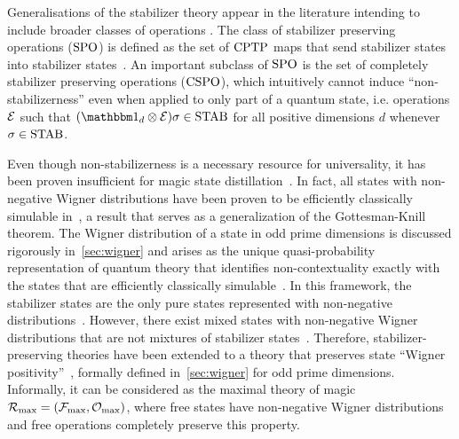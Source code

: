 \documentclass[pra,
aps,
twocolumn,
superscriptaddress,
groupedaddress,
nofootinbib,
reprint
]{revtex4-1}
\begin{document}
Generalisations of the stabilizer theory appear in the literature intending to include broader classes of operations .
The class of stabilizer preserving operations (${\rm{SPO}}$) is defined as the set of ${\rm{CPTP}}$ maps that send stabilizer states into stabilizer states~\cite{cit:ahmadi}.
An important subclass of ${\rm{SPO}}$ is the set of completely stabilizer preserving operations (${\rm{CSPO}}$), which intuitively cannot induce ``non-stabilizerness'' even when applied to only part of a quantum state, i.e. operations $\mathcal{E}$ such that $(\id_d \otimes \E ) \sigma \in \stab$ for all positive dimensions $d$ whenever $\sigma \in {\rm{STAB}}$.

Even though non-stabilizerness is a necessary resource for universality, it has been proven insufficient for magic state distillation~\cite{cit:bravyi, cit:campbell}.
In fact, all states with non-negative Wigner distributions have been proven to be efficiently classically simulable in~\cite{cit:mari}, a result that serves as a generalization of the Gottesman-Knill theorem.
The Wigner distribution of a state in odd prime dimensions is discussed rigorously in~\cref{sec:wigner} and arises as the unique quasi-probability representation of quantum theory that identifies non-contextuality exactly with the states that are efficiently classically simulable~\cite{cit:howard2, cit:veitch2}.
In this framework, the stabilizer states are the only pure states represented with non-negative distributions~\cite{cit:gross3}. 
However, there exist mixed states with non-negative Wigner distributions that are not mixtures of stabilizer states~\cite{cit:gross}.
Therefore, stabilizer-preserving theories have been extended to a theory that preserves state ``Wigner positivity''~\cite{cit:wang}, formally defined in~\cref{sec:wigner} for odd prime dimensions.
Informally, it can be considered as the maximal theory of magic $\mathcal{R}_{\rm{}max} = (\mathcal{F}_{\rm{max}}, \mathcal{O}_{\rm{}max})$, where free states have non-negative Wigner distributions and free operations completely preserve this property.

\end{document}
